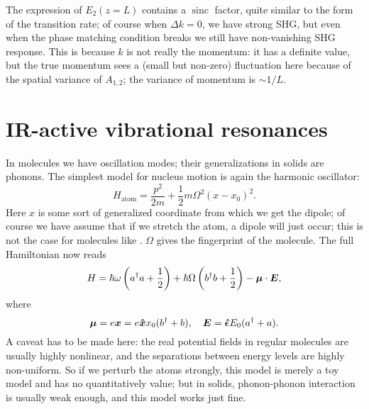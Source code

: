 \documentclass[hyperref, a4paper]{article}
\DeclareMathOperator{\sinc}{sinc}
\begin{document}
The expression of $E_2(z = L)$ contains a $\sinc$ factor, 
quite similar to the form of the transition rate; 
of course when $\Delta k = 0$, 
we have strong SHG, 
but even when the phase matching condition breaks 
we still have non-vanishing SHG response. 
This is because $k$ is not really the momentum:
it has a definite value, 
but the true momentum sees a (small but non-zero) fluctuation here 
because of the spatial variance of $A_{1, 2}$; 
the variance of momentum is $\sim 1 / L$.

\section{IR-active vibrational resonances}

In molecules we have oscillation modes; 
their generalizations in solids are phonons.
The simplest model for nucleus motion is again the harmonic oscillator:
\begin{equation}
    H_{\text{atom}} = \frac{p^2}{2m} + \frac{1}{2} m \Omega^2 (x - x_0)^2. 
\end{equation}
Here $x$ is some sort of generalized coordinate
from which we get the dipole; 
of course we have assume that if we stretch the atom, 
a dipole will just occur;
this is not the case for molecules like .
$\Omega$ gives the fingerprint of the molecule.
The full Hamiltonian now reads 
\begin{equation}
    H = \hbar \omega \left(
        a^\dagger a + \frac{1}{2}
    \right) + 
    \hbar \Omega \left(
        b^\dagger b + \frac{1}{2}
    \right) - \vb*{\mu} \cdot \vb*{E}, 
\end{equation}
where 
\begin{equation}
    \vb*{\mu} = e \vb*{x} = e \vu*{x} x_0 (b^\dagger + b), \quad 
    \vb*{E} = \vu*{\epsilon} E_0 (a^\dagger + a).
\end{equation}
A caveat has to be made here: 
the real potential fields in regular molecules 
are usually highly nonlinear, 
and the separations between energy levels are highly non-uniform.
So if we perturb the atoms strongly, 
this model is merely a toy model and has no quantitatively value; 
but in solids, phonon-phonon interaction is usually weak enough, 
and this model works just fine.
\end{document}
